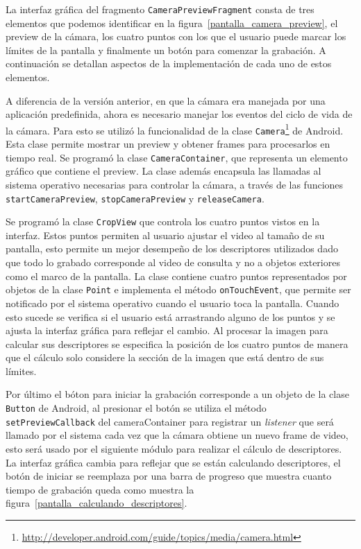 La interfaz gráfica del fragmento \texttt{CameraPreviewFragment} consta de tres elementos que podemos identificar en la figura~\ref{pantalla_camera_preview}, el preview de la cámara, los cuatro puntos con los que el usuario puede marcar los límites de la pantalla y finalmente un botón para comenzar la grabación. A continuación se detallan aspectos de la implementación de cada uno de estos elementos.

A diferencia de la versión anterior, en que la cámara era manejada por una aplicación predefinida, ahora es necesario manejar los eventos del ciclo de vida de la cámara. Para esto se utilizó la funcionalidad de la clase \texttt{Camera}\footnote{\url{http://developer.android.com/guide/topics/media/camera.html}} de Android. Esta clase permite mostrar un preview y obtener frames para procesarlos en tiempo real. Se programó la clase \texttt{CameraContainer}, que representa un elemento gráfico que contiene el preview. La clase además encapsula las llamadas al sistema operativo necesarias para controlar la cámara, a través de las funciones \texttt{startCameraPreview}, \texttt{stopCameraPreview} y \texttt{releaseCamera}.

Se programó la clase \texttt{CropView} que controla los cuatro puntos vistos en la interfaz. Estos puntos permiten al usuario ajustar el video al tamaño de su pantalla, esto permite un mejor desempeño de los descriptores utilizados dado que todo lo grabado corresponde al video de consulta y no a objetos exteriores como el marco de la pantalla. La clase contiene cuatro puntos representados por objetos de la clase \texttt{Point} e implementa el método \texttt{onTouchEvent}, que permite ser notificado por el sistema operativo cuando el usuario toca la pantalla. Cuando esto sucede se verifica si el usuario está arrastrando alguno de los puntos y se ajusta la interfaz gráfica para reflejar el cambio. Al procesar la imagen para calcular sus descriptores se especifica la posición de los cuatro puntos de manera que el cálculo solo considere la sección de la imagen que está dentro de sus límites.

Por último el bóton para iniciar la grabación corresponde a un objeto de la clase \texttt{Button} de Android, al presionar el botón se utiliza el método \texttt{setPreviewCallback} del cameraContainer para registrar un \emph{listener} que será llamado por el sistema cada vez que la cámara obtiene un nuevo frame de video, esto será usado por el siguiente módulo para realizar el cálculo de descriptores. La interfaz gráfica cambia para reflejar que se están calculando descriptores, el botón de iniciar se reemplaza por una barra de progreso que muestra cuanto tiempo de grabación queda como muestra la figura~\ref{pantalla_calculando_descriptores}.


